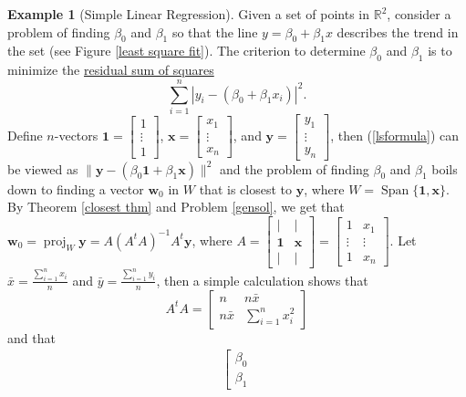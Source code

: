\documentclass[12pt,letterpaper]{book}
\numberwithin{equation}{section}
\theoremstyle{definition}
\newtheorem{example}[thm]{\textbf{Example}}
\newcommand{\vw}{\bm{w}}
\newcommand{\vx}{\bm{x}}
\newcommand{\vy}{\bm{y}}
\newcommand{\Span}{\operatorname{Span}}
\begin{document}
\begin{example}[Simple Linear Regression]\label{lsexample}
Given a set of points in $\mathbb{R}^2$, consider a problem of finding $\beta_0$ and $\beta_1$ so that the line $y=\beta_0+\beta_1 x$ describes the trend in the set (see Figure \ref{least square fit}). The criterion to determine $\beta_0$ and $\beta_1$ is to minimize the \underline{residual sum of squares}
\begin{equation}\label{lsformula} \sum_{i=1}^n |y_i-(\beta_0+\beta_1 x_i)|^2. \end{equation}
Define $n$-vectors $\bm{1}=\left[\begin{array}{c} 1 \\ \vdots \\ 1
\end{array}\right]$, $\vx=\left[\begin{array}{c} x_1 \\ \vdots \\ x_n
\end{array}\right]$, and  $\vy=\left[\begin{array}{c} y_1 \\ \vdots \\ y_n
\end{array}\right]$, then (\ref{lsformula}) can be viewed as $\|\vy-(\beta_0\bm{1}+\beta_1\vx)\|^2$ and the problem of finding $\beta_0$ and $\beta_1$ boils down to finding a vector $\vw_0$ in $W$ that is closest to $\vy$, where $W=\Span \{\bm{1},\vx\}$. By Theorem \ref{closest thm} and Problem \ref{gensol}, we get that $\vw_0=\operatorname{proj}_W \vy=A(A^tA)^{-1}A^t\vy$, where $A=\left[\begin{array}{cc} | & |  \\ \bm{1} & \vx \\ | & |  \end{array}\right]=\left[\begin{array}{cc} 1 & x_1 \\ \vdots & \vdots \\ 1 & x_n  \end{array}\right]$. Let $\bar{x}=\frac{\sum_{i=1}^n x_i}{n}$ and $\bar{y}=\frac{\sum_{i=1}^n y_i}{n}$, then a simple calculation shows that
$$A^tA=\left[\begin{array}{cc} n & n\bar{x}  \\ n\bar{x} & \sum_{i=1}^n x_i^2 \end{array}\right]$$ and that
\begin{align*}\left[\begin{array}{c} \beta_0 \\ \beta_1

\end{array}
\end{align*}
\end{example}
\end{document}
